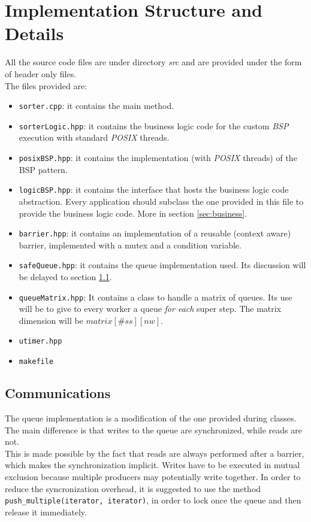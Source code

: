 \documentclass[]{article}
\def\code#1{\texttt{#1}}
\begin{document}
\section{Implementation Structure and Details}
\label{sec:implDetails}

All the source code files are under directory \emph{src} and are provided under the form of header only files. \\The files provided are:
\begin{itemize}
	\item \code{sorter.cpp}: it contains the main method. 
	\item \code{sorterLogic.hpp}: it contains the business logic code for the custom \emph{BSP} execution with standard \emph{POSIX} threads.
	\item \code{posixBSP.hpp}: it contains the implementation (with \emph{POSIX} threads) of the BSP pattern.
	\item \code{logicBSP.hpp}: it contains the interface that hosts the business logic code abstraction. Every application should subclass the one provided in this file to provide the business logic code. More in section \ref{sec:business}.
	\item \code{barrier.hpp}: it contains an implementation of a reusable (context aware) barrier, implemented with a mutex and a condition variable.
	\item \code{safeQueue.hpp}: it contains the queue implementation used. Its discussion will be delayed to section \ref{sec:queue}.
	\item \code{queueMatrix.hpp}: It contains a class to handle a matrix of queues. Its use will be to give to every worker a queue \emph{for each} super step. The matrix dimension will be $matrix[\#\mathit{ss}][\mathit{nw}]$.
	\item \code{utimer.hpp}
	\item \code{makefile}
\end{itemize}

\subsection{Communications}
\label{sec:queue}
The queue implementation is a modification of the one provided during classes. The main difference is that writes to the queue are synchronized, while reads are not. \\ This is made possible by the fact that reads are always performed after a barrier, which makes the synchronization implicit. Writes have to be executed in mutual exclusion because multiple producers may potentially write together. In order to reduce the syncronization overhead, it is suggested to use the method \code{push\_multiple(iterator, iterator)}, in order to lock once the queue and then release it immediately.
\end{document}

